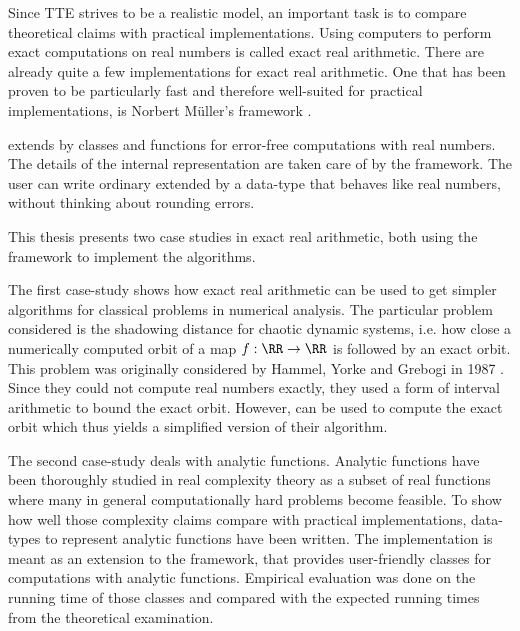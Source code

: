 Since TTE strives to be a realistic model, an important task is to compare
theoretical claims with practical implementations.
Using computers to perform exact computations on real numbers is called exact
real arithmetic.
There are already quite a few implementations for exact real arithmetic.
One that has been proven to be particularly fast and therefore well-suited for
practical implementations, is Norbert M\"uller's \cc framework \irram
\cite{irram}.

\irram extends \cc by classes and functions for error-free computations with
real numbers.
The details of the internal representation are taken care of by the framework. 
The user can write ordinary \cc extended by a data-type that behaves like
real numbers, without thinking about rounding errors.

This thesis presents two case studies in exact real arithmetic, both using the
\irram framework to implement the algorithms.

The first case-study shows how exact real arithmetic can be used to get simpler
algorithms for classical problems in numerical analysis.
The particular problem considered is the shadowing distance for chaotic
dynamic systems, i.e. how close a numerically computed orbit of a map $f: \RR
\to \RR$ is followed by an exact orbit.
This problem was originally considered by Hammel, Yorke and Grebogi in 1987
\cite{Hammel1987}. 
Since they could not compute real numbers exactly, they used a form of interval
arithmetic to bound the exact orbit.
However, \irram can be used to compute the exact orbit which thus yields a
simplified version of their algorithm.

The second case-study deals with analytic functions. 
Analytic functions have been thoroughly studied in real complexity theory as a
subset of real functions where many in general computationally hard problems become feasible. 
To show how well those complexity claims compare with practical
implementations, data-types to represent analytic functions have been written.
The implementation is meant as an extension to the \irram framework, that
provides user-friendly classes for computations with analytic functions.
Empirical evaluation was done on the running time of those classes and compared
with the expected running times from the theoretical examination.

